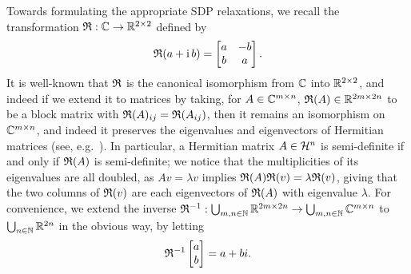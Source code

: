 Towards formulating the appropriate SDP relaxations, we recall the transformation $\mathfrak{R} : \mathbb{C} \to \mathbb{R}^{2 \times 2}$ %
defined by \[\mathfrak{R}(a + \mathrm{i}\, b) = \begin{bmatrix} a & -b \\ b & a \end{bmatrix}.\]  It is well-known that $\mathfrak{R}$ is the canonical isomorphism from $\mathbb{C}$ into $\mathbb{R}^{2 \times 2}$, and indeed if we extend it to matrices by taking, for $A \in \mathbb{C}^{m \times n}$, $\mathfrak{R}(A) \in \mathbb{R}^{2m \times 2n}$ to be a block matrix with $\mathfrak{R}(A)_{ij} = \mathfrak{R}(A_{ij})$, then it remains an isomorphism on $\mathbb{C}^{m \times n}$, and indeed it preserves the eigenvalues and eigenvectors of Hermitian matrices (see, e.g.~\cite[p.~101]{wedderburn1934matrices}).  In particular, a Hermitian matrix $A \in \mathcal{H}^n$ is semi-definite if and only if $\mathfrak{R}(A)$ is semi-definite; we notice that the multiplicities of its eigenvalues are all doubled, as $A v = \lambda v$ implies $\mathfrak{R}(A) \mathfrak{R}(v) = \lambda \mathfrak{R}(v)$, giving that the two columns of $\mathfrak{R}(v)$ are each eigenvectors of $\mathfrak{R}(A)$ with eigenvalue $\lambda$.  For convenience, we extend the inverse $\mathfrak{R}^{-1} : \bigcup_{m, n \in \mathbb{N}} \mathbb{R}^{2m \times 2n} \to \bigcup_{m, n \in \mathbb{N}} \mathbb{C}^{m \times n}$ to $\bigcup_{n \in \mathbb{N}} \mathbb{R}^{2n}$ in the obvious way, by letting \[\mathfrak{R}^{-1}\begin{bmatrix} a \\ b \end{bmatrix} = a + b i.\]

